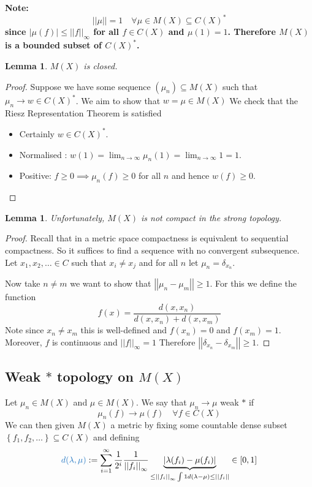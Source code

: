 \documentclass[11pt]{article}
\newcommand{\defeq}{:=}
\newcommand{\abs}[1]{\left|#1\right|}
\newcommand{\norm}[1]{\left|\left|#1\right|\right|}
\newenvironment{defin}
	{\begin{mdframed}[backgroundcolor=white, roundcorner=5pt, linewidth=1pt, linecolor=RoyalBlue]}
	{\end{mdframed}}
\newcommand{\mdf}[1]{{\color{RoyalBlue} #1}}
\newenvironment{note}
	{\begin{mdframed}[backgroundcolor=white, linecolor=RubineRed, roundcorner=5pt, linewidth=1pt]\bfseries{Note:}\normalfont}
	{\end{mdframed}}
\newtheorem{lemma}[prop]{Lemma}
\begin{document}
\begin{note}
	\[
 		\norm{\mu} =1 \quad \forall \mu \in M(X) \subseteq C(X)^\ast
	\]
	since $\abs{\mu(f)}\leq\norm{f}_\infty$ for all $f\in C(X)$ and $\mu(1)=1$.
	Therefore $M(X)$ is a bounded subset of $C(X)^\ast$.
\end{note}

\begin{lemma}
$M(X)$ is closed.
\end{lemma}

\begin{proof}
Suppose we have some sequence $(\mu_n)\subseteq M(X)$ such that $\mu_n\to w\in C(X)^\ast$.
We aim to show that $w=\mu\in M(X)$
We check that the Riesz Representation Theorem is satisfied
\begin{itemize}
	\item Certainly $w\in C(X)^\ast$.
	\item Normalised : $w(1)=\lim_{n\to\infty}\mu_n(1) = \lim_{n\to\infty}1=1$.
	\item Positive: $f\geq 0 \implies \mu_n(f)\geq 0$ for all $n$ and hence $w(f)\geq 0$.
\end{itemize}
\end{proof}

\begin{lemma}
Unfortunately, $M(X)$ is not compact in the strong topology.
\end{lemma}
\begin{proof}
Recall that in a metric space compactness is equivalent to sequential compactness.
So it suffices to find a sequence with no convergent subsequence.
Let $x_1, x_2, \dots \in C$ such that $x_i\neq x_j$ and for all $n$ let $\mu_n=\delta_{x_n}$.

Now take $n\neq m$ we want to show that $\norm{\mu_n - \mu_m} \geq 1$.
For this we define the function 
\[
	f(x)=\frac{d(x, x_n)}{d(x, x_n) + d(x, x_m)}
\]
Note since $x_n\neq x_m$ this is well-defined and $f(x_n)=0$ and $f(x_m)=1$.
Moreover, $f$ is continuous and $\norm{f}_\infty = 1$
Therefore $\norm{\delta_{x_n}-\delta_{x_m}}\geq 1$.
\end{proof}

\subsection{Weak $\ast$ topology on $M(X)$}
\begin{defin}
	Let $\mu_n\in M(X)$ and $\mu\in M(X)$.
	We say that $\mu_n\to\mu$ \mdf{weak $\ast$} if
	\[
		\mu_n(f)\to\mu(f) \quad \forall f\in C(X)
	\]
	We can then given $M(X)$ a metric by fixing some countable dense subset $\left\{ f_1, f_2, \dots \right\}\subseteq C(X)$ and defining
	\[
		\mdf{d(\lambda, \mu)}\defeq \sum_{i=1}^{\infty}\frac{1}{2^i}\frac{1}{\norm{f_i}_\infty}\underbrace{\abs{\lambda(f_i)-\mu(f_i)}}_{\leq\norm{f_i}_\infty \int 1 d(\lambda - \mu) \leq \norm{f_i}}\in [0, 1]
	\]
\end{defin}
\end{document}
